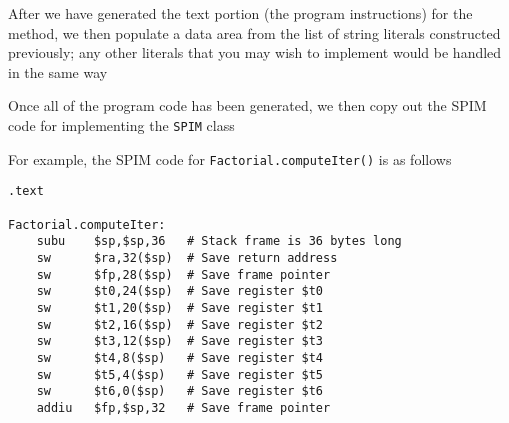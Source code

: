 \documentclass[8pt,a4paper,compress]{beamer}
\begin{document}
\begin{frame}[fragile]
\pause

After we have generated the text portion (the program instructions) for the method, we then populate
a data area from the list of string literals constructed previously; any other literals that you may wish to implement would be handled in the same way

\pause
\bigskip

Once all of the program code has been generated, we then copy out the SPIM code for implementing the \lstinline{SPIM} class

\pause
\bigskip

For example, the SPIM code for \lstinline{Factorial.computeIter()} is as follows
\begin{lstlisting}[language={}]
.text

Factorial.computeIter:
    subu    $sp,$sp,36   # Stack frame is 36 bytes long
    sw      $ra,32($sp)  # Save return address
    sw      $fp,28($sp)  # Save frame pointer
    sw      $t0,24($sp)  # Save register $t0                                                                                                                                                                                                  
    sw      $t1,20($sp)  # Save register $t1
    sw      $t2,16($sp)  # Save register $t2                                                                                                                                                                                                  
    sw      $t3,12($sp)  # Save register $t3
    sw      $t4,8($sp)   # Save register $t4                                                                                                                                                                                                  
    sw      $t5,4($sp)   # Save register $t5
    sw      $t6,0($sp)   # Save register $t6                                                                                                                                                                                                  
    addiu   $fp,$sp,32   # Save frame pointer                                                                                                                                                                                                 
                                                                                                                                                                                                                                              

\end{lstlisting}
\end{frame}
\end{document}

